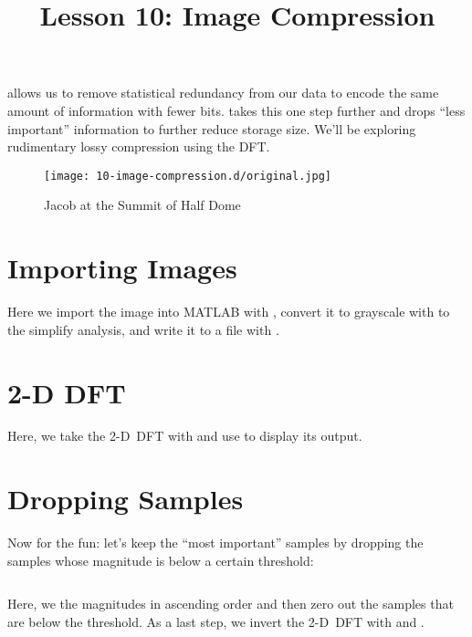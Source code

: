 \documentclass{article}
\title{Lesson 10: Image Compression}
\begin{document}
\renderTitle

 allows us to remove statistical redundancy from our
data to encode the same amount of information with fewer bits.
 takes this one step further and drops
\enquote{less important} information to further reduce storage size.
We'll be exploring rudimentary lossy compression using the DFT.

\begin{figure}[ht!]
	\texttt{[image: 10-image-compression.d/original.jpg]}
	\caption{Jacob at the Summit of Half Dome}
\end{figure}

\section{Importing Images}


Here we import the image into MATLAB with , convert it to
grayscale with  to the simplify analysis, and write it to a
file with .

\section{2-D DFT}


Here, we take the 2-D~DFT with  and use  to display its
output.

\section{Dropping Samples}

Now for the fun: let's keep the \enquote{most important} samples by
dropping the samples whose magnitude is below a certain threshold:

\inputminted{matlab}{10-image-compression.d/compressed.m}

Here, we  the magnitudes in ascending order and then zero out the samples
that are below the threshold.  As a last step, we invert the 2-D~DFT
with  and .
\end{document}
